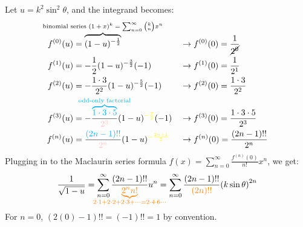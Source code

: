 \documentclass[preview]{standalone}
\begin{document}
\color{white}

Let $u = k^2 \sin^2 \theta$, and the integrand becomes:
\begin{align*}
  f^{(0)}(u) &=
  \overbrace{(1-u)^{-\frac{1}{2}}}^{\mathclap{\text{binomial series $(1+x)^k =
  \sum_{n=0}^{\infty} \binom{k}{n} x^n$}}} &&\rightarrow f^{(0)}(0) =
  \frac{1}{\cancel{2^0}} \\
  f^{(1)}(u) &= -\frac{1}{2} (1-u)^{-\frac{3}{2}} (-1) &&\rightarrow
  f^{(1)}(0) = \frac{1}{2^1} \\
  f^{(2)}(u) &= -\frac{1\cdot3}{2^2} (1-u)^{-\frac{5}{2}} (-1)
  &&\rightarrow f^{(2)}(0) = \frac{1\cdot3}{2^2} \\
  f^{(3)}(u) &=
  -\frac{\color{cyan}\overbrace{1\cdot3\cdot5}^{\mathclap{\text{odd-only
  factorial}}}}{\color{pink}2^3} (1-u)^{\color{yellow} -\frac{7}{2}} (-1)
  &&\rightarrow f^{(3)}(0) =
  \frac{1\cdot3\cdot5}{2^3} \\
  f^{(n)}(u) &= \frac{{\color{cyan}(2n-1)!!}}{{\color{pink}2^n}}
  (1-u)^{\color{yellow} -\frac{2n+1}{2}}
  &&\rightarrow f^{(n)}(0) = \frac{{(2n-1)!!}}{{2^n}}
\end{align*}
Plugging in to the Maclaurin series formula $f(x) =
\sum_{n=0}^{\infty} \frac{f^{(n)}(0)}{n!} x^n$, we get:
\[
  \frac{1}{\sqrt{1 - u}} = \sum_{n=0}^{\infty} \frac{
  (2n-1)!!}{\color{orange}\underbrace{2^n n!}_{\mathclap{2 \cdot 1 +
  2 \cdot 2 + 2 \cdot 3 + \cdots = 2 \cdot 4 \cdot 6 \cdots}}} u^n =
  \sum_{n=0}^{\infty} \frac{(2n-1)!!}{\color{orange} (2n)!!}
  {\left(k\sin\theta\right)}^{2n}
\]
For $n = 0$, $(2(0) - 1)!! = (-1)!! = 1$ by
convention.
\end{document}
